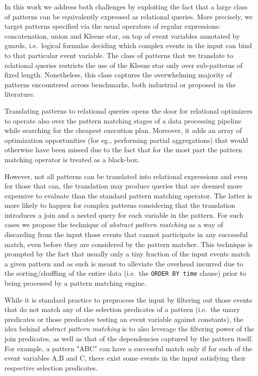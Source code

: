 \begin{comment}
Analytics are being run both over fresh data as well as historical data,
therefore the data management system needs to support both online and
batching mode processing.
\end{comment}

In this work we address both challenges by exploiting the fact that a large 
class of patterns can be equivalently expressed as relational queries.
More precisely, we target patterns specified via the usual operators of regular 
expressions: concatenation, union and Kleene star, on top of event variables 
annotated by guards, i.e.\ logical formulas deciding which complex events in 
the input can bind to that particular event variable.
The class of patterns that we translate to relational queries restricts the use 
of the Kleene star only over sub-patterns of fixed length.
Nonetheless, this class captures the overwhelming majority of patterns 
encountered across benchmarks, both industrial or proposed in the 
literature.    

Translating patterns to relational queries opens the door for relational 
optimizers to operate also over the pattern matching stages of a data 
processing pipeline while searching for the cheapest execution plan.
Moreover, it adds an array of optimization opportunities (for eg., performing 
partial aggregations) that would otherwise have been missed due to the fact 
that for the most part the  pattern matching operator is treated as a black-box.


However, not all patterns can be translated into relational expressions and 
even for those that can, the translation may produce queries that are deemed 
more expensive to evaluate than the standard pattern matching operator. 
The latter is more likely to happen for complex patterns considering that the 
translation introduces a join and a nested query for each variable in the 
pattern. 
For such cases we propose the technique of {\em abstract pattern matching} as a 
way of discarding from the input those events that cannot participate in any 
successful match, even before they are considered by the pattern matcher. 
This technique is prompted by the fact that usually only a tiny fraction of the 
input events match a given pattern and as such is meant to alleviate the 
overhead incurred due to the sorting/shuffling of the entire data (i.e.\ the 
\texttt{ORDER BY time}  clause) prior to being processed by a pattern matching 
engine.

While it is standard practice to preprocess the input by filtering out those 
events that do not match any of the selection predicates of a pattern (i.e.\ 
the unary predicates or those predicates testing an event variable against 
constants), the idea behind {\em abstract pattern matching} is to also leverage 
the filtering power of the join predicates, as well as that of the dependencies 
captured by the pattern itself. 
For example, a pattern "ABC" can have a successful match only if for each of 
the event variables A,B and C, there exist some events in the input satisfying 
their respective selection predicates.  

